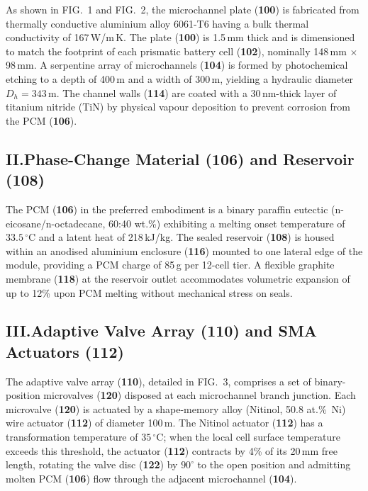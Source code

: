 \documentclass[12pt,letterpaper]{article}
\begin{document}
As shown in FIG.~1 and FIG.~2, the microchannel plate (\textbf{100}) is fabricated from
thermally conductive aluminium alloy 6061-T6 having a bulk thermal conductivity of
167\,W/m\,K. The plate (\textbf{100}) is 1.5\,mm thick and is dimensioned to match the
footprint of each prismatic battery cell (\textbf{102}), nominally 148\,mm $\times$ 98\,mm.
A serpentine array of microchannels (\textbf{104}) is formed by photochemical etching to a
depth of 400\,\textmu m and a width of 300\,\textmu m, yielding a hydraulic diameter
$D_h = 343$\,\textmu m. The channel walls (\textbf{114}) are coated with a
30\,nm-thick layer of titanium nitride (TiN) by physical vapour deposition to prevent
corrosion from the PCM (\textbf{106}).

\subsection*{II.\quad Phase-Change Material (106) and Reservoir (108)}

The PCM (\textbf{106}) in the preferred embodiment is a binary paraffin eutectic
(n-eicosane/n-octadecane, 60:40 wt.\%) exhibiting a melting onset temperature of
$33.5\,^{\circ}\mathrm{C}$ and a latent heat of 218\,kJ/kg. The sealed reservoir (\textbf{108}) is
housed within an anodised aluminium enclosure (\textbf{116}) mounted to one lateral edge of
the module, providing a PCM charge of 85\,g per 12-cell tier. A flexible graphite membrane
(\textbf{118}) at the reservoir outlet accommodates volumetric expansion of up to 12\% upon
PCM melting without mechanical stress on seals.

\subsection*{III.\quad Adaptive Valve Array (110) and SMA Actuators (112)}

The adaptive valve array (\textbf{110}), detailed in FIG.~3, comprises a set of
binary-position microvalves (\textbf{120}) disposed at each microchannel branch junction.
Each microvalve (\textbf{120}) is actuated by a shape-memory alloy (Nitinol, 50.8 at.\%~Ni)
wire actuator (\textbf{112}) of diameter 100\,\textmu m. The Nitinol actuator (\textbf{112})
has a transformation temperature of $35\,^{\circ}\mathrm{C}$; when the local cell surface temperature
exceeds this threshold, the actuator (\textbf{112}) contracts by 4\% of its 20\,mm free
length, rotating the valve disc (\textbf{122}) by $90^{\circ}$ to the open position and
admitting molten PCM (\textbf{106}) flow through the adjacent microchannel (\textbf{104}).
\end{document}
